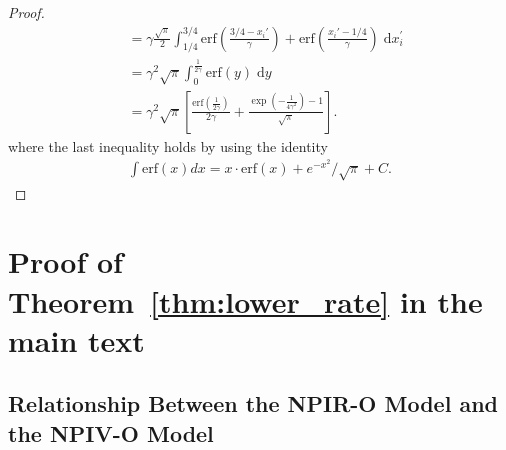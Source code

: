 \documentclass[11pt]{article}
\newcommand{\0}{\mathbf{0}}
\begin{document}
\begin{appendix}
\begin{proof}
\begin{align*}
        &= \gamma \frac{\sqrt{\pi}}{2} \int_{1/4}^{3/4} \mathrm{erf}\left(\frac{3/4-x_i'}{\gamma}\right) + \mathrm{erf}\left(\frac{x_i'-1/4}{\gamma}\right)  \;\mathrm{d} x_i^\prime \\
        &= \gamma^2 \sqrt{\pi} \int_{0}^{\frac{1}{2\gamma}} \mathrm{erf}(y)  \;\mathrm{d} y \\
        &= \gamma^2 \sqrt{\pi} \left[\frac{\mathrm{erf}\left(\frac{1}{2\gamma}\right)}{2\gamma} + \frac{\exp\left(-\frac{1}{4\gamma^2}\right)-1}{\sqrt{\pi}}\right] . 
    \end{align*}
    where the last inequality holds by using the identity
    \begin{align*}
        \int \mathrm{erf}(x) d x = x \cdot \mathrm{erf}(x) + e^{-x^2} / \sqrt{\pi} + C.
    \end{align*}
\end{proof}
\section{Proof of Theorem~\ref{thm:lower_rate} in the main text}
\label{sec:lower}

\subsection{Relationship Between the NPIR-O Model and the NPIV-O Model}
\label{sec:npir_reduction}


\end{appendix}
\end{document}
